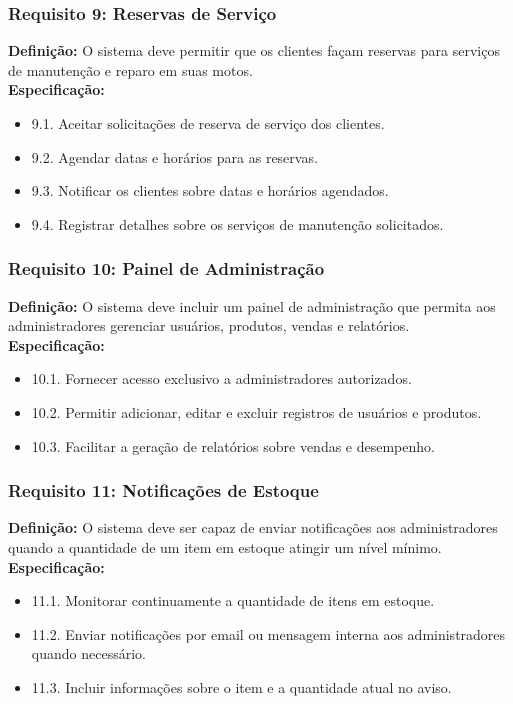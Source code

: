 \subsubsection{Requisito 9: Reservas de Serviço}
\textbf{Definição:} O sistema deve permitir que os clientes façam reservas para serviços de manutenção e reparo em suas motos.
\\
\textbf{Especificação:}
\begin{itemize}
	\item 9.1. Aceitar solicitações de reserva de serviço dos clientes.
	\item 9.2. Agendar datas e horários para as reservas.
	\item 9.3. Notificar os clientes sobre datas e horários agendados.
	\item 9.4. Registrar detalhes sobre os serviços de manutenção solicitados.
\end{itemize}

\subsubsection{Requisito 10: Painel de Administração}
\textbf{Definição:} O sistema deve incluir um painel de administração que permita aos administradores gerenciar usuários, produtos, vendas e relatórios.
\\
\textbf{Especificação:}
\begin{itemize}
	\item 10.1. Fornecer acesso exclusivo a administradores autorizados.
	\item 10.2. Permitir adicionar, editar e excluir registros de usuários e produtos.
	\item 10.3. Facilitar a geração de relatórios sobre vendas e desempenho.
\end{itemize}

\subsubsection{Requisito 11: Notificações de Estoque}
\textbf{Definição:} O sistema deve ser capaz de enviar notificações aos administradores quando a quantidade de um item em estoque atingir um nível mínimo.
\\
\textbf{Especificação:}
\begin{itemize}
	\item 11.1. Monitorar continuamente a quantidade de itens em estoque.
	\item 11.2. Enviar notificações por email ou mensagem interna aos administradores quando necessário.
	\item 11.3. Incluir informações sobre o item e a quantidade atual no aviso.
\end{itemize}

